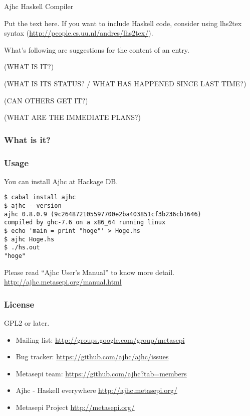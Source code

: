 \documentclass[DIV16,twocolumn,10pt]{scrreprt}
\begin{document}
\begin{hcarentry}{Ajhc Haskell Compiler}
\makeheader

Put the text here. 
If you want to include Haskell code, consider using lhs2tex syntax (\url{http://people.cs.uu.nl/andres/lhs2tex/}).

What's following are suggestions for the content of an entry.

(WHAT IS IT?)

(WHAT IS ITS STATUS? / WHAT HAS HAPPENED SINCE LAST TIME?)

(CAN OTHERS GET IT?)

(WHAT ARE THE IMMEDIATE PLANS?)

\newcommand{\WhatsIsIt}{\subsubsection*{What is it?}}
\newcommand{\Usage}{\subsubsection*{Usage}}
\newcommand{\License}{\subsubsection*{License}}

\WhatsIsIt

\WhatsNew

\Usage

You can install Ajhc at Hackage DB.

\begin{verbatim}
$ cabal install ajhc
$ ajhc --version
ajhc 0.8.0.9 (9c264872105597700e2ba403851cf3b236cb1646)
compiled by ghc-7.6 on a x86_64 running linux
$ echo 'main = print "hoge"' > Hoge.hs
$ ajhc Hoge.hs
$ ./hs.out
"hoge"
\end{verbatim}

Please read ``Ajhc User's Manual'' to know more detail. \url{http://ajhc.metasepi.org/manual.html}

\FuturePlans

\License

GPL2 or later.

\Contact
  \begin{itemize}
    \item Mailing list: \url{http://groups.google.com/group/metasepi}
    \item Bug tracker: \url{https://github.com/ajhc/ajhc/issues}
    \item Metasepi team: \url{https://github.com/ajhc?tab=members}
  \end{itemize}

\FurtherReading
  \begin{itemize}
    \item Ajhc - Haskell everywhere \url{http://ajhc.metasepi.org/}
    \item Metasepi Project \url{http://metasepi.org/}
  \end{itemize}
\end{hcarentry}
\end{document}
